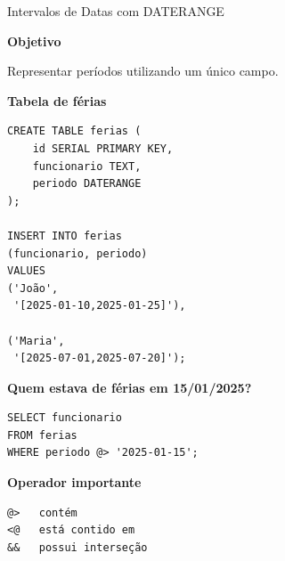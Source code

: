 \documentclass{beamer}
\begin{document}
\begin{frame}[fragile]{Intervalos de Datas com DATERANGE}

\textbf{Objetivo}

Representar períodos utilizando um único campo.

\vspace{0.3cm}

\textbf{Tabela de férias}

\begin{verbatim}
CREATE TABLE ferias (
    id SERIAL PRIMARY KEY,
    funcionario TEXT,
    periodo DATERANGE
);

INSERT INTO ferias
(funcionario, periodo)
VALUES
('João',
 '[2025-01-10,2025-01-25]'),

('Maria',
 '[2025-07-01,2025-07-20]');
\end{verbatim}

\vspace{0.2cm}

\textbf{Quem estava de férias em 15/01/2025?}

\begin{verbatim}
SELECT funcionario
FROM ferias
WHERE periodo @> '2025-01-15';
\end{verbatim}

\vspace{0.2cm}

\textbf{Operador importante}

\begin{verbatim}
@>   contém
<@   está contido em
&&   possui interseção
\end{verbatim}

\end{frame}
\end{document}

